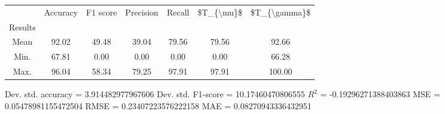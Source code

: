 \begin{tabular}{|c|c|c|c|c|c|c|}
\toprule
{} &  Accuracy &  F1 score &  Precision &  Recall &  \$T\_\{\textbackslash mu\}\$ &  \$T\_\{\textbackslash gamma\}\$ \\
Results &           &           &            &         &            &               \\
\hline
Mean    &     92.02 &     49.48 &      39.04 &   79.56 &      79.56 &         92.66 \\
Min.    &     67.81 &      0.00 &       0.00 &    0.00 &       0.00 &         66.28 \\
Max.    &     96.04 &     58.34 &      79.25 &   97.91 &      97.91 &        100.00 \\
\bottomrule
\end{tabular}

 Dev. std. accuracy = 3.914482977967606
 Dev. std. F1-score = 10.17460470806555
 $R^2$ = -0.19296271388403863
 MSE = 0.05478981155472504
 RMSE = 0.23407223576222158
 MAE = 0.08270943336432951
